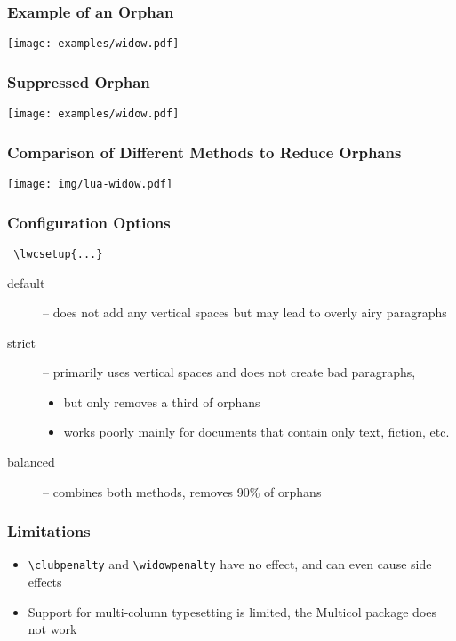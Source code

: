 \begin{frame}
  \frametitle{Example of an Orphan}
  \begin{center}
    \texttt{[image: examples/widow.pdf]}
  \end{center}
\end{frame}

\begin{frame}
  \frametitle{Suppressed Orphan}
  \begin{center}
    \texttt{[image: examples/widow.pdf]}
  \end{center}
\end{frame}

\begin{frame}
  \frametitle{Comparison of Different Methods to Reduce Orphans}
  \begin{priklad}
  \begin{center}
  \texttt{[image: img/lua-widow.pdf]}
  \end{center}
  \end{priklad}
\end{frame}

\begin{frame}[fragile]
  \frametitle{Configuration Options}
 \begin{verbatim}
 \lwcsetup{...}
 \end{verbatim}
 \begin{description}
   \item[default] -- does not add any vertical spaces but may lead to overly airy paragraphs
   \item[strict] -- primarily uses vertical spaces and does not create bad paragraphs,  
     \begin{itemize}
       \item but only removes a third of orphans
       \item works poorly mainly for documents that contain only text, fiction, etc.
     \end{itemize}
   \item[balanced] -- combines both methods, removes 90\% of orphans
  \end{description}
\end{frame}

\begin{frame}[fragile]
  \frametitle{Limitations}
    \begin{itemize}
      \item \verb|\clubpenalty| and \verb|\widowpenalty| have no effect, and can even cause side effects
      \item Support for multi-column typesetting is limited, the Multicol package does not work
  \end{itemize}
\end{frame}

